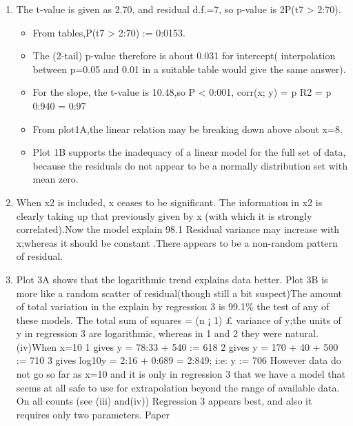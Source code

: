 \documentclass[a4paper,12pt]{article}
\begin{document}
\begin{enumerate}
    \item The t-value is given as 2.70, and residual d.f.=7, so p-value is 2P(t7 > 2:70).
    \begin{itemize}
        \item From tables,P(t7 > 2:70)
:=
0:0153.
    \end{itemize}
\begin{itemize}
    \item The (2-tail) p-value therefore is about 0.031 for intercept(
interpolation between p=0.05 and 0.01 in a suitable table would give the same
answer).
\item For the slope, the t-value is 10.48,so P < 0:001, corr(x; y) =
p
R2 =
p
0:940 = 0:97

\item From plot1A,the linear relation may be breaking down above about x=8. 
\item Plot 1B supports
the inadequacy of a linear model for the full set of data, because the residuals do not appear to be a normally distribution set with mean zero.
\end{itemize}

\item When x2 is included, x ceases to be significant. The information in x2 is clearly
taking up that previously given by x (with which it is strongly correlated).Now the model
explain 98.1%
Residual variance may increase with x;whereas it should be constant .There appears to
be a non-random pattern of residual.

\item Plot 3A shows that the logarithmic trend explains data better. Plot 3B is more
like a random scatter of residual(though still a bit suspect)The amount of total variation
in the explain by regression 3 is 99.1\% the test of any of these models.
The total sum of squares = (n ¡ 1) £ variance of y;the units of y in regression 3 are
logarithmic, whereas in 1 and 2 they were natural.
(iv)When x=10
1 gives y = 78:33 + 540
:=
618
2 gives y = 170 + 40 + 500
:=
710
3 gives log10y = 2:16 + 0:689 = 2:849; i:e: y
:=
706
However data do not go so far as x=10 and it is only in regression 3 that we have a
model that seems at all safe to use for extrapolation beyond the range of available data.
On all counts (see (iii) and(iv)) Regression 3 appears best, and also it requires only two
parameters.
Paper
\end{enumerate}
\end{document}
